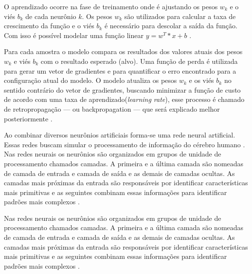 O aprendizado ocorre na fase de treinamento onde é ajustando os pesos $w_k$ e o viés $b_k$ de cada neurônio $k$. Os pesos $w_k$ são utilizados para calcular a taxa de crescimento da função e o viés $b_k$ é necessário para descolar a saída da função. Com isso é possível modelar uma função linear $y=w^T*x+b$ \cite{marti2017aprendizado}.

Para cada amostra o modelo compara os resultados dos valores atuais dos pesos $w_k$ e viés $b_k$ com o resultado esperado (alvo). Uma função de perda é utilizada para gerar um vetor de gradientes e para quantificar o erro encontrado para a configuração atual do modelo. O modelo atualiza os pesos $w_k$ e os viés $b_k$ no sentido contrário do vetor de gradientes, buscando minimizar a função de custo de acordo com uma taxa de aprendizado(\textit{learning rate}), esse processo é chamado de retropropagação — ou backpropagation — que será explicado melhor posteriormente \cite{marti2017aprendizado}.

Ao combinar diversos neurônios artificiais forma-se uma rede neural artificial. Essas redes buscam simular o processamento de informação do cérebro humano \cite{ferneda2006redes}.
Nas redes neurais os neurônios são organizados em grupos de unidade de processamento chamados camadas. A primeira e a última camada são nomeadas de camada de entrada e camada de saída e as demais de camadas ocultas. As camadas mais próximas da entrada são responsáveis por identificar características mais primitivas e as seguintes combinam essas informações para identificar padrões mais complexos \cite{marti2017aprendizado}.

Nas redes neurais os neurônios são organizados em grupos de unidade de processamento chamados camadas. A primeira e a última camada são nomeadas de camada de entrada e camada de saída e as demais de camadas ocultas. As camadas mais próximas da entrada são responsáveis por identificar características mais primitivas e as seguintes combinam essas informações para identificar padrões mais complexos \cite{marti2017aprendizado}.
